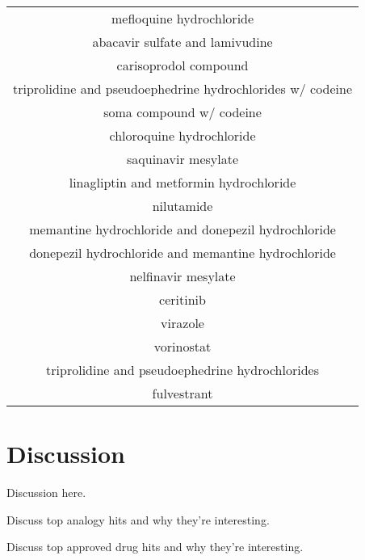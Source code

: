 \documentclass{article}
\newcommand{\lgc}[1]{\cellcolor[gray]{0.85}#1}
\begin{document}
\begin{table}[ht]
\begin{tabular}[t]{c}
\lgc{mefloquine hydrochloride\cite{Weston2020.03.25.008482}} \\
abacavir sulfate and lamivudine \\
carisoprodol compound \\
triprolidine and pseudoephedrine hydrochlorides w/ codeine \\
soma compound w/ codeine \\
\lgc{chloroquine hydrochloride\cite{wang2020remdesivir}} \\
saquinavir mesylate \\
linagliptin and metformin hydrochloride \\
nilutamide \\
memantine hydrochloride and donepezil hydrochloride \\
donepezil hydrochloride and memantine hydrochloride \\
nelfinavir mesylate \\
ceritinib \\
virazole \\
vorinostat \\
triprolidine and pseudoephedrine hydrochlorides \\
fulvestrant \\
\hline
\end{tabular}
\end{table}

\section{Discussion}

Discussion here.

Discuss top analogy hits and why they're interesting.

Discuss top approved drug hits and why they're interesting.



\end{document}

